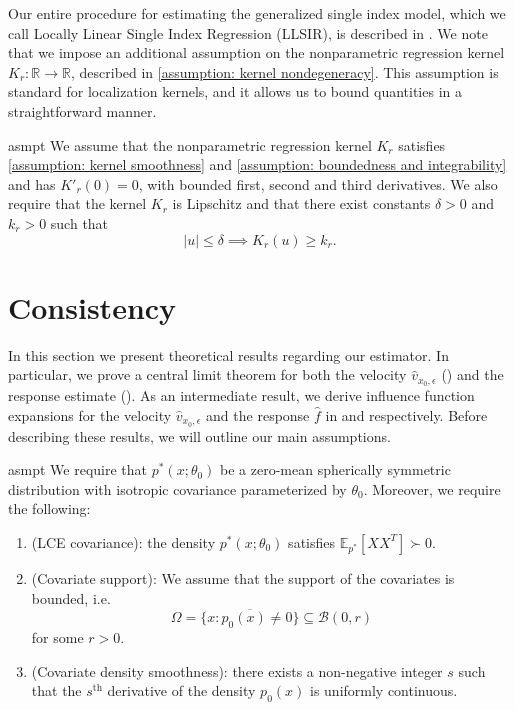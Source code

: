 \documentclass[11pt]{article}
\begin{document}
Our entire procedure for estimating the generalized single index model, which we call Locally Linear Single Index Regression (LLSIR), is described in . We note that we impose an additional assumption on the nonparametric regression kernel $K_r:\mathbb{R} \rightarrow \mathbb{R}$, described in \cref{assumption: kernel nondegeneracy}. This assumption is standard for localization kernels, and it allows us to bound quantities in a straightforward manner.

\begin{restatable}{asmpt}{} \label{assumption: kernel nondegeneracy}
    We assume that the nonparametric regression kernel $K_r$ satisfies \cref{assumption: kernel smoothness} and \cref{assumption: boundedness and integrability} and has $K'_r(0) = 0$, with bounded first, second and third derivatives. We also require that the kernel $K_r$ is Lipschitz and that there exist constants $\delta > 0$ and $k_r > 0$ such that 
    \[|u| \leq \delta \implies K_r(u) \geq k_r.\]
\end{restatable}

\section{Consistency}

In this section we present theoretical results regarding our estimator. In particular, we prove a central limit theorem for both the velocity $\hat{v}_{x_0, \epsilon}$ () and the response estimate (). As an intermediate result, we derive influence function expansions for the velocity $\hat{v}_{x_0, \epsilon}$ and the response $\hat f$ in  and  respectively. Before describing these results, we will outline our main assumptions.

\begin{restatable}{asmpt}{} \label{assumption: lce and covariate density}
    We require that $p^*(x;\theta_0)$ be a zero-mean spherically symmetric distribution with isotropic covariance parameterized by $\theta_0$. Moreover, we require the following: 
    \begin{enumerate}
        \item (LCE covariance): the density $p^*(x;\theta_0)$ satisfies $\mathbb{E}_{p^*}[XX^T] \succ 0$. 
        \item (Covariate support): We assume that the support of the covariates is bounded, i.e. \[\Omega = \overline{\{x : p_0(x) \neq 0\}} \subseteq \mathcal{B}(0, r)\]
        for some $r > 0$.
        \item (Covariate density smoothness): 
        there exists a non-negative integer $s$ such that the $s^{\text{th}}$ derivative of the density $p_0(x)$ is uniformly continuous.
    \end{enumerate} 
\end{restatable}
\end{document}
